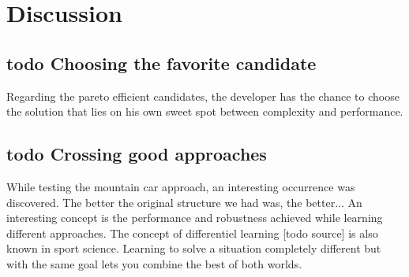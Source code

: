 \chapter{Discussion}

\section{todo Choosing the favorite candidate}
Regarding the pareto efficient candidates, the developer has the chance to choose the solution that lies on his own sweet spot between complexity and performance. 

\section{todo Crossing good approaches}

While testing the mountain car approach, an interesting occurrence was discovered. The better the original structure  we had was, the better...
An interesting concept is the performance and robustness achieved while learning different approaches.
The concept of differentiel learning [todo source] is also known in sport science. Learning to solve a situation completely different but with the same goal lets you combine the best of both worlds.
